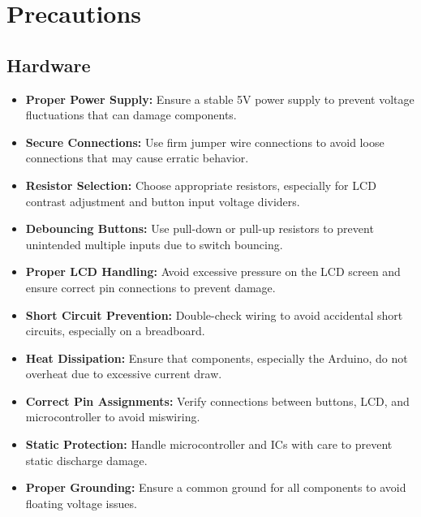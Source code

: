 \documentclass[a4paper,12pt]{article}
\theoremstyle{remark}
\begin{document}
\section{Precautions}
\subsection{Hardware}
\begin{itemize}
    \item \textbf{Proper Power Supply:} Ensure a stable 5V power supply to prevent voltage fluctuations that can damage components.
    \item \textbf{Secure Connections:} Use firm jumper wire connections to avoid loose connections that may cause erratic behavior.
    \item \textbf{Resistor Selection:} Choose appropriate resistors, especially for LCD contrast adjustment and button input voltage dividers.
    \item \textbf{Debouncing Buttons:} Use pull-down or pull-up resistors to prevent unintended multiple inputs due to switch bouncing.
    \item \textbf{Proper LCD Handling:} Avoid excessive pressure on the LCD screen and ensure correct pin connections to prevent damage.
    \item \textbf{Short Circuit Prevention:} Double-check wiring to avoid accidental short circuits, especially on a breadboard.
    \item \textbf{Heat Dissipation:} Ensure that components, especially the Arduino, do not overheat due to excessive current draw.
    \item \textbf{Correct Pin Assignments:} Verify connections between buttons, LCD, and microcontroller to avoid miswiring.
    \item \textbf{Static Protection:} Handle microcontroller and ICs with care to prevent static discharge damage.
    \item \textbf{Proper Grounding:} Ensure a common ground for all components to avoid floating voltage issues.
\end{itemize}
\end{document}
